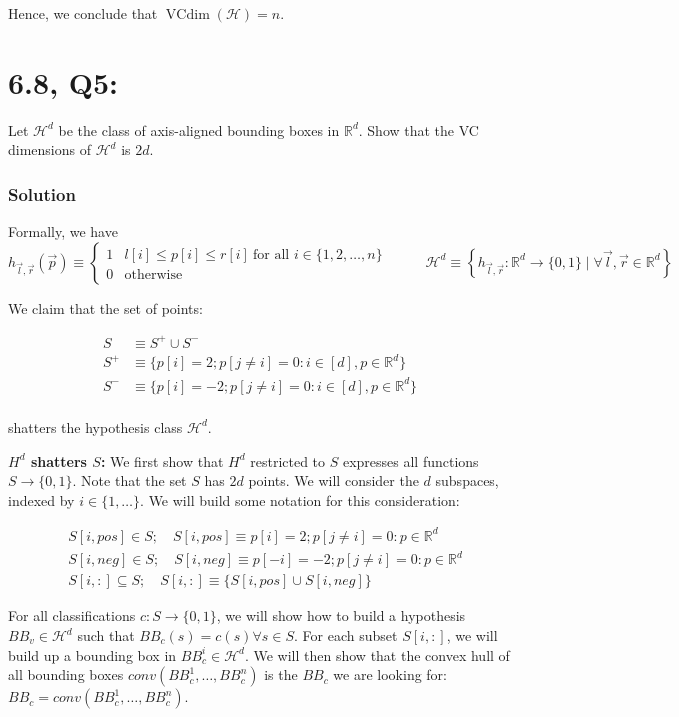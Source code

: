\documentclass[11pt]{article}
\newcommand{\R}{\ensuremath{\mathbb R}}
\renewcommand{\H}{\ensuremath{\mathcal{H}}}
\DeclareMathOperator{\vcdim}{VCdim}
\newcommand{\vc}{\ensuremath{\vcdim}}
\begin{document}
Hence, we conclude that $\vc(\H) = n$.

\section*{6.8, Q5:}
Let $\H^d$ be the class of axis-aligned bounding boxes in $\R^d$. Show that
the VC dimensions of $\H^d$ is $2d$.


\subsubsection*{Solution}
Formally, we have 
$$
h_{\vec l, \vec r}(\vec p) \equiv
\begin{cases}
1 &  l[i] \leq p[i] \leq r[i]~\text{for all $i \in \{1, 2, \dots, n \}$ } \\
0 & \text{otherwise}
\end{cases} \qquad
\H^d \equiv \left\{ h_{\vec l, \vec r}: \R^d \rightarrow \{0, 1\} \mid \forall \vec l, \vec r \in \mathbb R^d \right\}
$$

We claim that the set of points:

\begin{align*}
S &\equiv S^+ \cup S^- \\
S^+ &\equiv \{ p[i] = 2; p[j \neq i]  = 0 : i \in [d], p \in \R^d \} \\
S^- &\equiv \{ p[i] = -2; p[j \neq i] = 0 : i \in [d], p \in \R^d  \} \\
\end{align*}

shatters the hypothesis class $\H^d$.

\textbf{$H^d$ shatters $S$:}
We first show that $H^d$ restricted to $S$ expresses all functions $S \rightarrow \{0, 1\}$.
Note that the set $S$ has $2d$ points. We will consider the $d$ subspaces,
indexed by $i \in \{1, \dots \}$. We will build some notation for this
consideration:

\begin{align*}
&S[i, pos] \in S; \quad S[i, pos] \equiv p[i] = 2; p[j \neq i] = 0 : p \in \R^d  \\
&S[i, neg] \in S; \quad S[i, neg] \equiv p[-i] = -2; p[j \neq i] = 0 : p \in \R^d \\
&S[i, :] \subseteq S; \quad S[i, :] \equiv \{ S[i, pos] \cup S[i, neg] \}
\end{align*}


For all classifications $c: S \rightarrow \{0, 1\}$, we will show how to build a
hypothesis $BB_v \in \H^d$ such that $BB_c(s) = c(s) \forall s \in S$.
For each subset $S[i, :]$, we will build up a bounding box in $BB_c^i \in \H^d$.
We will then show that the convex hull of
all bounding boxes $conv(BB_c^1, \dots, BB_c^n)$ is the $BB_c$ we are looking for:
$BB_c = conv(BB_c^1, \dots, BB_c^n)$.
\end{document}
